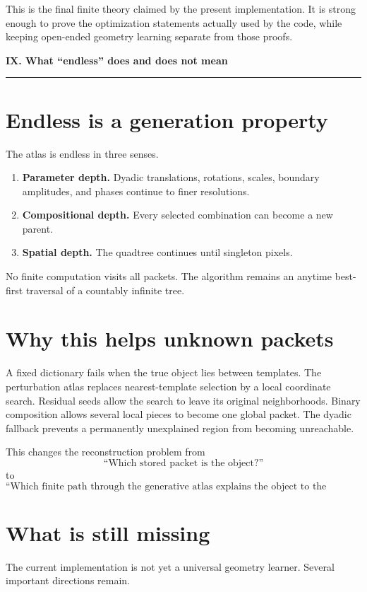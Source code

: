\documentclass[11pt]{article}
\theoremstyle{definition}
\theoremstyle{remark}
\newcommand{\InlinePart}[1]{%
  \Needspace{15\baselineskip}%
  \vspace{1.5em}%
  {\color{Blue}\LARGE\bfseries #1\par}%
  \vspace{0.55em}%
  {\color{Blue}\rule{\linewidth}{1.1pt}}\par%
  \vspace{0.75em}%
}
\begin{document}
This is the final finite theory claimed by the present implementation. It is strong enough to prove the optimization statements actually used by the code, while keeping open-ended geometry learning separate from those proofs.

\InlinePart{IX. What ``endless'' does and does not mean}


\section{Endless is a generation property}
The atlas is endless in three senses.

\begin{enumerate}
\item \textbf{Parameter depth.} Dyadic translations, rotations, scales, boundary amplitudes, and phases continue to finer resolutions.
\item \textbf{Compositional depth.} Every selected combination can become a new parent.
\item \textbf{Spatial depth.} The quadtree continues until singleton pixels.
\end{enumerate}

No finite computation visits all packets. The algorithm remains an anytime best-first traversal of a countably infinite tree.

\section{Why this helps unknown packets}
A fixed dictionary fails when the true object lies between templates. The perturbation atlas replaces nearest-template selection by a local coordinate search. Residual seeds allow the search to leave its original neighborhoods. Binary composition allows several local pieces to become one global packet. The dyadic fallback prevents a permanently unexplained region from becoming unreachable.

This changes the reconstruction problem from
\[
\text{``Which stored packet is the object?''}
\]
to
\[
\boxed{
\text{``Which finite path through the generative atlas explains the object to the required tolerance?''}
}
\]

\section{What is still missing}
The current implementation is not yet a universal geometry learner. Several important directions remain.
\end{document}
